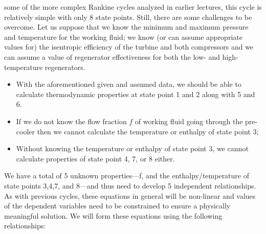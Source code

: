  some of the more complex Rankine cycles analyzed in earlier lectures, this cycle is relatively simple with only 8 state points.  Still, there are some challenges to be overcome.  Let us suppose that we know the minimum and maximum pressure and temperature for the working fluid; we know (or can assume appropriate values for) the isentropic efficiency of the turbine and both compressors and we can assume a value of regenerator effectiveness for both the low- and high-temperature regenerators.
\begin{itemize}
\item With the aforementioned given and assumed data, we should be able to calculate thermodynamic properties at state point 1 and 2 along with 5 and 6. 
\item If we do not know the flow fraction $f$ of working fluid going through the pre-cooler then we cannot calculate the temperature or enthalpy of state point 3;
\item Without knowing the temperature or enthalpy of state point 3, we cannot calculate properties of state point 4, 7, or 8 either.
\end{itemize}
We have a total of 5 unknown properties---f, and the enthalpy/temperature of state points 3,4,7, and 8---and thus need to develop 5 independent relationships.  As with previous cycles, these equations in general will be non-linear and values of the dependent variables need to be constrained to ensure a physically meaningful solution.  We will form these equations using the following relationships:
